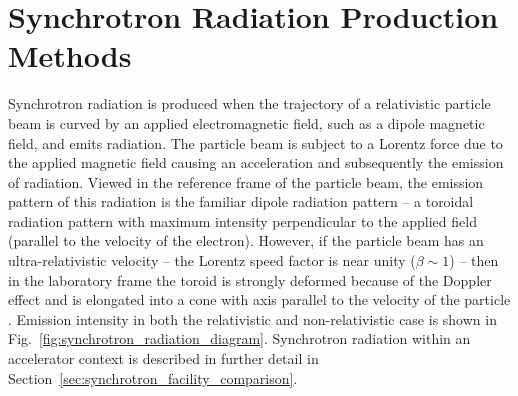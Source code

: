 \documentclass[../main.tex]{subfiles}
\begin{document}

\section{Synchrotron Radiation Production Methods}
\label{sec:synchrotron_radiation_intro}

Synchrotron radiation is produced when the trajectory of a relativistic particle beam is curved by an applied electromagnetic field, such as a dipole magnetic field, and emits radiation. The particle beam is subject to a Lorentz force due to the applied magnetic field causing an acceleration and subsequently the emission of radiation. Viewed in the reference frame of the particle beam, the emission pattern of this radiation is the familiar dipole radiation pattern -- a toroidal radiation pattern with maximum intensity perpendicular to the applied field (parallel to the velocity of the electron). However, if the particle beam has an ultra-relativistic velocity -- the Lorentz speed factor is near unity ($\beta\sim1$) -- then in the laboratory frame the toroid is strongly deformed because of the Doppler effect and is elongated into a cone with axis parallel to the velocity of the particle \cite{ternov1995synchrotron}. Emission intensity in both the relativistic and non-relativistic case is shown in Fig.~\ref{fig:synchrotron_radiation_diagram}. Synchrotron radiation within an accelerator context is described in further detail in Section~\ref{sec:synchrotron_facility_comparison}.
\end{document}
